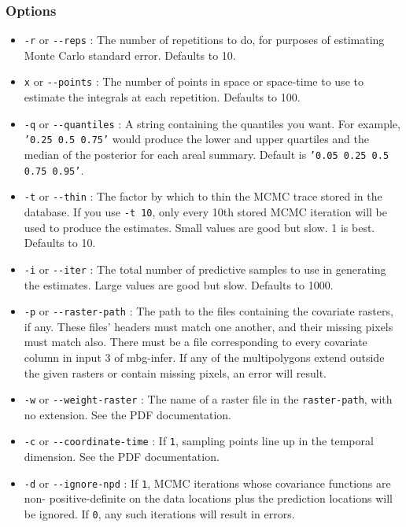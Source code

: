 \subsubsection{Options%
}
%
\begin{itemize}

\item \texttt{-r} or \texttt{-{}-reps} : The number of repetitions to do, for purposes of estimating Monte
Carlo standard error. Defaults to 10.

\item \texttt{x} or \texttt{-{}-points} : The number of points in space or space-time to use to estimate the
integrals at each repetition. Defaults to 100.

\item \texttt{-q} or \texttt{-{}-quantiles} : A string containing the quantiles you want. For example,
\texttt{'0.25 0.5 0.75'} would produce the lower and upper quartiles and the median of the
posterior for each areal summary. Default is \texttt{'0.05 0.25 0.5 0.75 0.95'}.

\item \texttt{-t} or \texttt{-{}-thin} : The factor by which to thin the MCMC trace stored in the database.
If you use \texttt{-t 10}, only every 10th stored MCMC iteration will be used to produce the
estimates. Small values are good but slow. 1 is best. Defaults to 10.

\item \texttt{-i} or \texttt{-{}-iter} : The total number of predictive samples to use in generating the
estimates. Large values are good but slow. Defaults to 1000.

\item \texttt{-p} or \texttt{-{}-raster-path} : The path to the files containing the covariate rasters, if any.
These files' headers must match one another, and their missing pixels must match also. There
must be a file corresponding to every covariate column in input 3 of mbg-infer. If any of the
multipolygons extend outside the given rasters or contain missing pixels, an error will result.

\item \texttt{-w} or \texttt{-{}-weight-raster} : The name of a raster file in the \texttt{raster-path}, with no
extension. See the PDF documentation.

\item \texttt{-c} or \texttt{-{}-coordinate-time} : If \texttt{1}, sampling points line up in the temporal dimension.
See the PDF documentation.

\item \texttt{-d} or \texttt{-{}-ignore-npd} : If \texttt{1}, MCMC iterations whose covariance functions are non-
positive-definite on the data locations plus the prediction locations will be ignored. If
\texttt{0}, any such iterations will result in errors.

\end{itemize}




